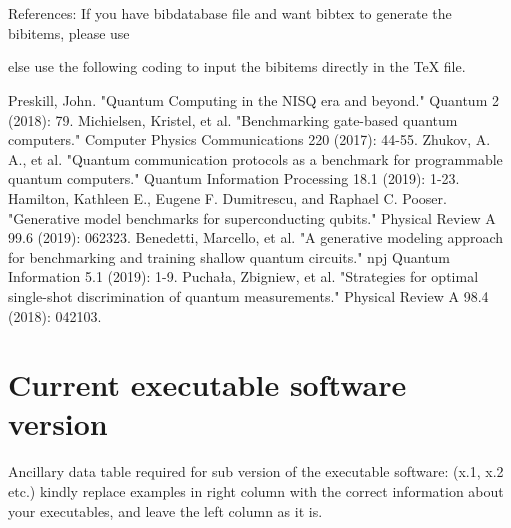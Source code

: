 \documentclass[preprint,12pt, a4paper]{elsarticle}
\newcommand{\1}{{\rm 1\hspace{-0.9mm}l}}
\begin{document}
 \section{}
 \label{}

 References:
 If you have bibdatabase file and want bibtex to generate the
 bibitems, please use

   
  

 else use the following coding to input the bibitems directly in the
 TeX file.
 
 
 
 

\begin{thebibliography}{00}

 Preskill, John. "Quantum Computing in the NISQ era and 
beyond." Quantum 2 (2018): 79.
 Michielsen, Kristel, et al. "Benchmarking 
gate-based quantum computers." Computer Physics Communications 220 (2017): 
44-55.
 Zhukov, A. A., et al. "Quantum communication 
protocols as a benchmark for programmable quantum computers." Quantum 
Information Processing 18.1 (2019): 1-23.
 Hamilton, Kathleen E., Eugene F. Dumitrescu, 
and Raphael C. Pooser. "Generative model benchmarks for superconducting 
qubits." Physical Review A 99.6 (2019): 062323.
 Benedetti, Marcello, et al. "A generative 
modeling approach for benchmarking and training shallow quantum circuits." npj 
Quantum Information 5.1 (2019): 1-9.
 Puchała, Zbigniew, et al. "Strategies for 
optimal single-shot discrimination of quantum measurements." Physical Review A 
98.4 (2018): 042103.
\end{thebibliography}

\section*{Current executable software version}
\label{}

Ancillary data table required for sub version of the executable software: (x.1, 
x.2 etc.) kindly replace examples in right column with the correct information 
about your executables, and leave the left column as it is.
\end{document}
